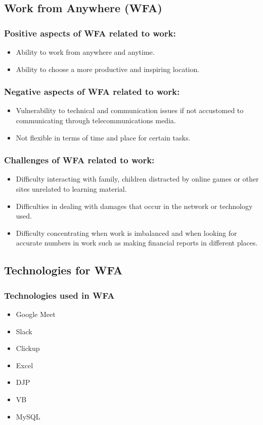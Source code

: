 \documentclass[conference]{IEEEtran}
\begin{document}
\subsection{Work from Anywhere (WFA)}
\subsubsection{Positive aspects of WFA related to work:}
\begin{itemize}
\item Ability to work from anywhere and anytime.
\item Ability to choose a more productive and inspiring location.
\end{itemize}

\subsubsection{Negative aspects of WFA related to work:}
\begin{itemize}
\item Vulnerability to technical and communication issues if not accustomed to communicating through telecommunications media.
\item Not flexible in terms of time and place for certain tasks.
\end{itemize}
\subsubsection{Challenges of WFA related to work:}
\begin{itemize}
\item Difficulty interacting with family, children distracted by online games or other sites unrelated to learning material.
\item Difficulties in dealing with damages that occur in the network or technology used.
\item Difficulty concentrating when work is imbalanced and when looking for accurate numbers in work such as making financial reports in different places.
\end{itemize}

\subsection{Technologies for WFA}
\subsubsection{Technologies used in WFA}
\begin{itemize}
\item Google Meet
\item Slack
\item Clickup
\item Excel
\item DJP
\item VB
\item MySQL
\end{itemize}
\end{document}
